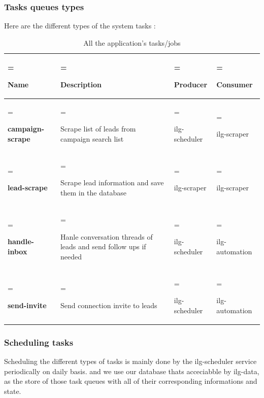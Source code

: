 \subsubsection{Tasks queues types}
Here are the different types of the system tasks :
\begin{table}[H]
	\renewcommand{\arraystretch}{1.5}%
	\caption{All the application's tasks/jobs}
	\centering
	\medskip
	\begin{tabularx}{1\textwidth} {
			| >{\hsize=1.2\hsize\linewidth=\hsize\raggedright\arraybackslash}X
			| >{\hsize=1.2\hsize\linewidth=\hsize\raggedright\arraybackslash}X
			| >{\hsize=0.8\hsize\linewidth=\hsize\raggedright\arraybackslash}X
			| >{\hsize=0.8\hsize\linewidth=\hsize\raggedright\arraybackslash}X |}
		\hline
		\rowcolor{primary} \textbf {Name} & \textbf {Description}                                             & \textbf {Producer} & \textbf {Consumer} \\
		\hline
		\textbf {campaign-scrape}         & Scrape list of leads from campaign search list                    & ilg-scheduler      & ilg-scraper        \\
		\hline
		\textbf {lead-scrape}             & Scrape lead information and save them in the database             & ilg-scraper        & ilg-scraper        \\
		\hline
		\textbf {handle-inbox}            & Hanle conversation threads of leads and send follow ups if needed & ilg-scheduler      & ilg-automation     \\
		\hline
		\textbf {send-invite}             & Send connection invite to leads                                   & ilg-scheduler      & ilg-automation     \\
		\hline
	\end{tabularx}
\end{table}
\newpage
\subsubsection{Scheduling tasks}
Scheduling the different types of tasks is mainly done by the ilg-scheduler service periodically on daily basis. and we use our database thats acceciabble by ilg-data, as the store of those task queues with all of their corresponding informations and state. 
\linebreak
{}

